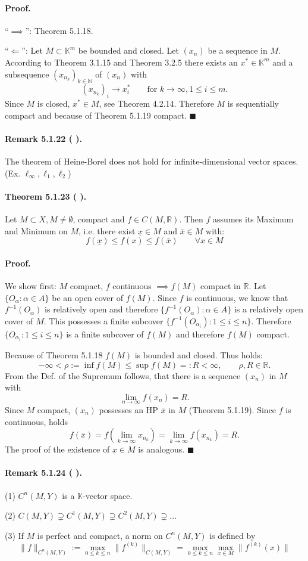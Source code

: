 \documentclass[12pt]{article}
\newcommand{\N}{\mathbb{N}}
\newcommand{\R}{\mathbb{R}}
\newcommand{\K}{\mathbb{K}} %
\newcommand{\NumberedTheorem}[3]{%
\paragraph*{Theorem #1 ( #2 ).} #3\par}
\newcommand{\NumberedRemark}[3]{%
\paragraph*{Remark #1 ( #2 ).} #3\par}
\begin{document}
\paragraph*{Proof.}
``$\implies$'': Theorem 5.1.18.
\par
``$\Longleftarrow$'':
Let $M \subset \K^m$ be bounded and closed. Let $(x_n)$ be a sequence in $M$. According to Theorem 3.1.15 and Theorem 3.2.5 there exists an $x^* \in \K^m$ and a subsequence $(x_{n_k})_{k \in \N}$ of $(x_n)$ with
\[
(x_{n_k})_i \longrightarrow x^*_i \qquad \text{for } k \to \infty, 1 \le i \le m.
\]
Since $M$ is closed, $x^* \in M$, see Theorem 4.2.14. Therefore $M$ is sequentially compact and because of Theorem 5.1.19 compact.
\hfill $\blacksquare$

\NumberedRemark{5.1.22}{}{The theorem of Heine-Borel does not hold for infinite-dimensional vector spaces. (Ex. $\ell_\infty, \ell_1, \ell_2$)}

\NumberedTheorem{5.1.23}{}{Let $M \subset X, M \neq \emptyset$, compact and $f \in C(M, \R)$. Then $f$ assumes its Maximum and Minimum on $M$, i.e. there exist $\underline{x} \in M$ and $\bar{x} \in M$ with:
\[
f(\underline{x}) \le f(x) \le f(\bar{x}) \qquad \forall x \in M
\]
}

\paragraph*{Proof.} We show first: $M$ compact, $f$ continuous $\implies f(M)$ compact in $\R$. Let $\{O_\alpha : \alpha \in A\}$ be an open cover of $f(M)$. Since $f$ is continuous, we know that $f^{-1}(O_\alpha)$ is relatively open and therefore $\{f^{-1}(O_\alpha) : \alpha \in A\}$ is a relatively open cover of $M$. This possesses a finite subcover $\{f^{-1}(O_{\alpha_i}) : 1 \le i \le n\}$. Therefore $\{O_{\alpha_i} : 1 \le i \le n\}$ is a finite subcover of $f(M)$ and therefore $f(M)$ compact.
\par
Because of Theorem 5.1.18 $f(M)$ is bounded and closed. Thus holds:
\[
-\infty < \rho := \inf f(M) \le \sup f(M) =: R < \infty, \qquad \rho, R \in \R.
\]
From the Def. of the Supremum follows, that there is a sequence $(x_n)$ in $M$ with
\[
\lim_{n \to \infty} f(x_n) = R.
\]
Since $M$ compact, $(x_n)$ possesses an HP $\bar{x}$ in $M$ (Theorem 5.1.19). Since $f$ is continuous, holds
\[
f(\bar{x}) = f(\lim_{k \to \infty} x_{n_k}) = \lim_{k \to \infty} f(x_{n_k}) = R.
\]
The proof of the existence of $\underline{x} \in M$ is analogous. \hfill $\blacksquare$

\NumberedRemark{5.1.24}{}{
(1) $C^n(M, Y)$ is a $\K$-vector space.
\par
(2) $C(M, Y) \supsetneq C^1(M, Y) \supsetneq C^2(M, Y) \supsetneq \dots$
\par
(3) If $M$ is perfect and compact, a norm on $C^n(M, Y)$ is defined by
\[
\|f\|_{C^n(M, Y)} := \max_{0 \le k \le n} \|f^{(k)}\|_{C(M, Y)} = \max_{0 \le k \le n} \max_{x \in M} \|f^{(k)}(x)\|
\]
}
\end{document}
